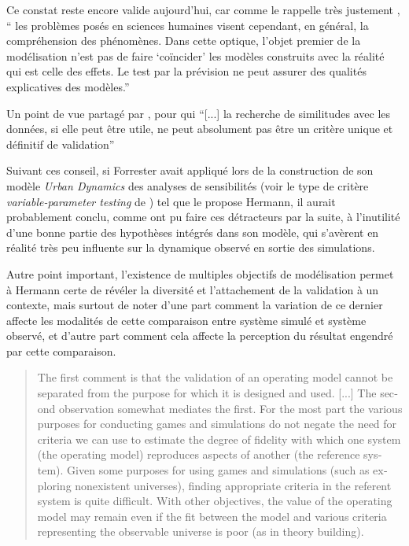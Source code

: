 Ce constat reste encore valide aujourd'hui, car comme le rappelle très justement \textcite[32]{Bulle2005}, \enquote{ les problèmes posés en sciences humaines visent cependant, en général, la compréhension des phénomènes. Dans cette optique, l’objet premier de la modélisation n’est pas de faire \enquote{coïncider} les modèles construits avec la réalité qui est celle des effets. Le test par la prévision ne peut assurer des qualités explicatives des modèles.}

Un point de vue partagé par \textcite[106]{Amblard2006}, pour qui \enquote{[...] la recherche de similitudes avec les données, si elle peut être utile, ne peut absolument pas être un critère unique et définitif de validation}

Suivant ces conseil, si Forrester avait appliqué lors de la construction de son modèle \textit{Urban Dynamics} des analyses de sensibilités (voir le type de critère \textit{variable-parameter testing} de \autocite{Hermann1967}) tel que le propose Hermann, il aurait probablement conclu, comme ont pu faire ces détracteurs par la suite, à l'inutilité d'une bonne partie des hypothèses intégrés dans son modèle, qui s'avèrent en réalité très peu influente sur la dynamique observé en sortie des simulations.

Autre point important, l'existence de multiples objectifs de modélisation permet à Hermann certe de révéler la diversité et l'attachement de la validation à un contexte, mais surtout de noter d'une part comment la variation de ce dernier affecte les modalités de cette comparaison entre système simulé et système observé, et d'autre part comment cela affecte la perception du résultat engendré par cette comparaison.

\foreignblockquote{english}[{\cite[219]{Hermann1967}}]{The first comment is that the validation of an operating model cannot be separated from the purpose for which it is designed and used. [...] The second observation somewhat mediates the first. For the most part the various purposes for conducting games and simulations do not negate the need for criteria we can use to estimate the degree of fidelity with which one system (the operating model) reproduces aspects of another (the reference system). Given some purposes for using games and simulations (such as exploring nonexistent universes), finding appropriate criteria in the referent system is quite difficult. With other objectives, the value of the operating model may remain even if the fit between the model and various criteria representing the observable universe is poor (as in theory building).} 

